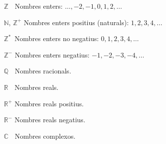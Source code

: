 \begin{list}{}
{\setlength{\labelwidth}{15mm} \setlength{\leftmargin}{20mm}
\setlength{\labelsep}{5mm}}
    \item[$\mathbb{Z\phantom{{}^+}}$] Nombres enters: $\ldots,-2,-1,0,1,2,\ldots$
    \item[$\mathbb{N}$, $\mathbb{Z}^+$] Nombres enters positius
    (naturals): $1,2,3,4,\ldots$
    \item[$\mathbb{Z}^*\,$] Nombres enters no negatius: $0,1,2,3,4,\ldots$
    \item[$\mathbb{Z}^-$] Nombres enters negatius: $-1,-2,-3,-4,\ldots$
    \item[$\mathbb{Q\phantom{{}^+}}$] Nombres racionals.
    \item[$\mathbb{R\phantom{{}^+}}$] Nombres reals.
    \item[$\mathbb{R}^+$] Nombres reals positius.
    \item[$\mathbb{R}^-$] Nombres reals negatius.
    \item[$\mathbb{C\phantom{{}^+}}$] Nombres complexos.
\end{list}
 
 
 
 
 
